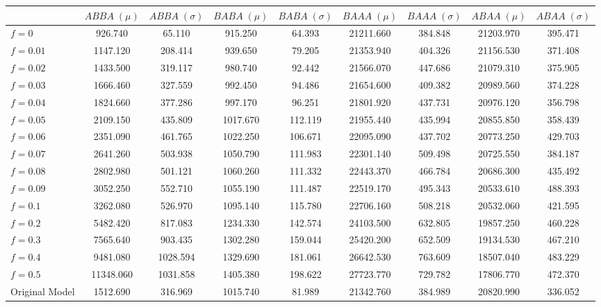 \begin{tabular}{lcccccccc}
\toprule
 & $ABBA \;(\mu)$ & $ABBA \;(\sigma)$ & $BABA \;(\mu)$ & $BABA \;(\sigma)$ & $BAAA \;(\mu)$ & $BAAA \;(\sigma)$ & $ABAA \;(\mu)$ & $ABAA \;(\sigma)$ \\
\midrule
$f = 0$ & 926.740 & 65.110 & 915.250 & 64.393 & 21211.660 & 384.848 & 21203.970 & 395.471 \\
$f = 0.01$ & 1147.120 & 208.414 & 939.650 & 79.205 & 21353.940 & 404.326 & 21156.530 & 371.408 \\
$f = 0.02$ & 1433.500 & 319.117 & 980.740 & 92.442 & 21566.070 & 447.686 & 21079.310 & 375.905 \\
$f = 0.03$ & 1666.460 & 327.559 & 992.450 & 94.486 & 21654.600 & 409.382 & 20989.560 & 374.228 \\
$f = 0.04$ & 1824.660 & 377.286 & 997.170 & 96.251 & 21801.920 & 437.731 & 20976.120 & 356.798 \\
$f = 0.05$ & 2109.150 & 435.809 & 1017.670 & 112.119 & 21955.440 & 435.994 & 20855.850 & 358.439 \\
$f = 0.06$ & 2351.090 & 461.765 & 1022.250 & 106.671 & 22095.090 & 437.702 & 20773.250 & 429.703 \\
$f = 0.07$ & 2641.260 & 503.938 & 1050.790 & 111.983 & 22301.140 & 509.498 & 20725.550 & 384.187 \\
$f = 0.08$ & 2802.980 & 501.121 & 1060.260 & 111.332 & 22443.370 & 466.784 & 20686.300 & 435.492 \\
$f = 0.09$ & 3052.250 & 552.710 & 1055.190 & 111.487 & 22519.170 & 495.343 & 20533.610 & 488.393 \\
$f = 0.1$ & 3262.080 & 526.970 & 1095.140 & 115.780 & 22706.160 & 508.218 & 20532.060 & 421.595 \\
$f = 0.2$ & 5482.420 & 817.083 & 1234.330 & 142.574 & 24103.500 & 632.805 & 19857.250 & 460.228 \\
$f = 0.3$ & 7565.640 & 903.435 & 1302.280 & 159.044 & 25420.200 & 652.509 & 19134.530 & 467.210 \\
$f = 0.4$ & 9481.080 & 1028.594 & 1329.690 & 181.061 & 26642.530 & 763.609 & 18507.040 & 483.229 \\
$f = 0.5$ & 11348.060 & 1031.858 & 1405.380 & 198.622 & 27723.770 & 729.782 & 17806.770 & 472.370 \\
Original Model & 1512.690 & 316.969 & 1015.740 & 81.989 & 21342.760 & 384.989 & 20820.990 & 336.052 \\
\bottomrule
\end{tabular}
